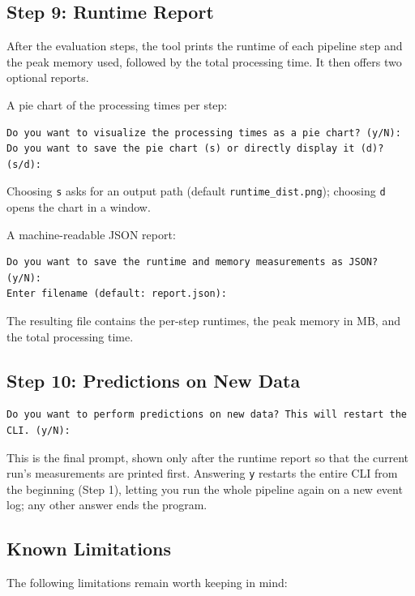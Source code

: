 \documentclass[12pt,a4paper]{article}
\begin{document}
\subsection{Step 9: Runtime Report}
After the evaluation steps, the tool prints the runtime of each pipeline step and the peak memory used, followed by the total processing time. It then offers two optional reports.

A pie chart of the processing times per step:
\begin{verbatim}
Do you want to visualize the processing times as a pie chart? (y/N):
Do you want to save the pie chart (s) or directly display it (d)? (s/d):
\end{verbatim}
Choosing \texttt{s} asks for an output path (default \texttt{runtime\_dist.png}); choosing \texttt{d} opens the chart in a window.

A machine-readable JSON report:
\begin{verbatim}
Do you want to save the runtime and memory measurements as JSON? (y/N):
Enter filename (default: report.json):
\end{verbatim}
The resulting file contains the per-step runtimes, the peak memory in MB, and the total processing time.

\subsection{Step 10: Predictions on New Data}
\begin{verbatim}
Do you want to perform predictions on new data? This will restart the CLI. (y/N):
\end{verbatim}

This is the final prompt, shown only after the runtime report so that the current run's measurements are printed first. Answering \texttt{y} restarts the entire CLI from the beginning (Step 1), letting you run the whole pipeline again on a new event log; any other answer ends the program.

\subsection{Known Limitations}
The following limitations remain worth keeping in mind:
\end{document}

